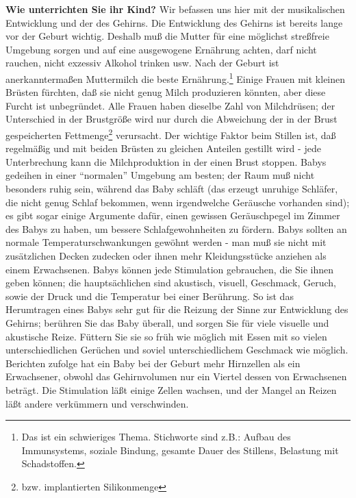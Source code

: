 \textbf{Wie unterrichten Sie ihr Kind?}
Wir befassen uns hier mit der musikalischen Entwicklung und der des Gehirns.
Die Entwicklung des Gehirns ist bereits lange vor der Geburt wichtig.
Deshalb muß die Mutter für eine möglichst streßfreie Umgebung sorgen und auf eine ausgewogene Ernährung achten, darf nicht rauchen, nicht exzessiv Alkohol trinken usw.
Nach der Geburt ist anerkanntermaßen Muttermilch die beste Ernährung.\footnote{Das ist ein schwieriges Thema. Stichworte sind z.B.: Aufbau des Immunsystems, soziale Bindung, gesamte Dauer des Stillens, Belastung mit Schadstoffen.}
Einige Frauen mit kleinen Brüsten fürchten, daß sie nicht genug Milch produzieren könnten, aber diese Furcht ist unbegründet.
Alle Frauen haben dieselbe Zahl von Milchdrüsen; der Unterschied in der Brustgröße wird nur durch die Abweichung der in der Brust gespeicherten Fettmenge\footnote{bzw. implantierten Silikonmenge} verursacht.
Der wichtige Faktor beim Stillen ist, daß regelmäßig und mit beiden Brüsten zu gleichen Anteilen gestillt wird - jede Unterbrechung kann die Milchproduktion in der einen Brust stoppen.
Babys gedeihen in einer \enquote{normalen} Umgebung am besten; der Raum muß nicht besonders ruhig sein, während das Baby schläft (das erzeugt unruhige Schläfer, die nicht genug Schlaf bekommen, wenn irgendwelche Geräusche vorhanden sind); es gibt sogar einige Argumente dafür, einen gewissen Geräuschpegel im Zimmer des Babys zu haben, um bessere Schlafgewohnheiten zu fördern.
Babys sollten an normale Temperaturschwankungen gewöhnt werden - man muß sie nicht mit zusätzlichen Decken zudecken oder ihnen mehr Kleidungsstücke anziehen als einem Erwachsenen.
Babys können jede Stimulation gebrauchen, die Sie ihnen geben können; die hauptsächlichen sind akustisch, visuell, Geschmack, Geruch, sowie der Druck und die Temperatur bei einer Berührung.
So ist das Herumtragen eines Babys sehr gut für die Reizung der Sinne zur Entwicklung des Gehirns; berühren Sie das Baby überall, und sorgen Sie für viele visuelle und akustische Reize.
Füttern Sie sie so früh wie möglich mit Essen mit so vielen unterschiedlichen Gerüchen und soviel unterschiedlichem Geschmack wie möglich.
Berichten zufolge hat ein Baby bei der Geburt mehr Hirnzellen als ein Erwachsener, obwohl das Gehirnvolumen nur ein Viertel dessen von Erwachsenen beträgt.
Die Stimulation läßt einige Zellen wachsen, und der Mangel an Reizen läßt andere verkümmern und verschwinden.


